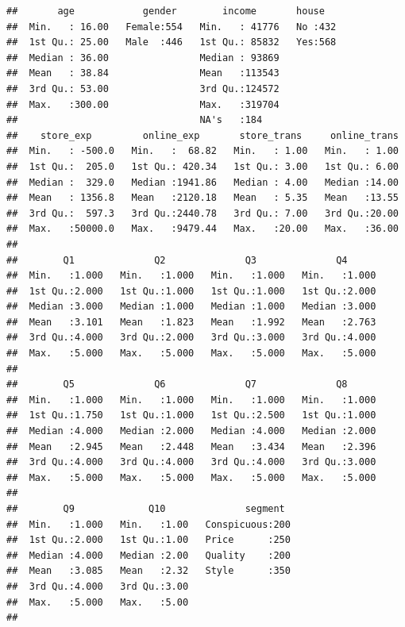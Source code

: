 \documentclass[]{book}
\theoremstyle{definition}
\theoremstyle{definition}
\theoremstyle{remark}
\begin{document}
\begin{verbatim}
##       age            gender        income       house    
##  Min.   : 16.00   Female:554   Min.   : 41776   No :432  
##  1st Qu.: 25.00   Male  :446   1st Qu.: 85832   Yes:568  
##  Median : 36.00                Median : 93869            
##  Mean   : 38.84                Mean   :113543            
##  3rd Qu.: 53.00                3rd Qu.:124572            
##  Max.   :300.00                Max.   :319704            
##                                NA's   :184               
##    store_exp         online_exp       store_trans     online_trans  
##  Min.   : -500.0   Min.   :  68.82   Min.   : 1.00   Min.   : 1.00  
##  1st Qu.:  205.0   1st Qu.: 420.34   1st Qu.: 3.00   1st Qu.: 6.00  
##  Median :  329.0   Median :1941.86   Median : 4.00   Median :14.00  
##  Mean   : 1356.8   Mean   :2120.18   Mean   : 5.35   Mean   :13.55  
##  3rd Qu.:  597.3   3rd Qu.:2440.78   3rd Qu.: 7.00   3rd Qu.:20.00  
##  Max.   :50000.0   Max.   :9479.44   Max.   :20.00   Max.   :36.00  
##                                                                     
##        Q1              Q2              Q3              Q4       
##  Min.   :1.000   Min.   :1.000   Min.   :1.000   Min.   :1.000  
##  1st Qu.:2.000   1st Qu.:1.000   1st Qu.:1.000   1st Qu.:2.000  
##  Median :3.000   Median :1.000   Median :1.000   Median :3.000  
##  Mean   :3.101   Mean   :1.823   Mean   :1.992   Mean   :2.763  
##  3rd Qu.:4.000   3rd Qu.:2.000   3rd Qu.:3.000   3rd Qu.:4.000  
##  Max.   :5.000   Max.   :5.000   Max.   :5.000   Max.   :5.000  
##                                                                 
##        Q5              Q6              Q7              Q8       
##  Min.   :1.000   Min.   :1.000   Min.   :1.000   Min.   :1.000  
##  1st Qu.:1.750   1st Qu.:1.000   1st Qu.:2.500   1st Qu.:1.000  
##  Median :4.000   Median :2.000   Median :4.000   Median :2.000  
##  Mean   :2.945   Mean   :2.448   Mean   :3.434   Mean   :2.396  
##  3rd Qu.:4.000   3rd Qu.:4.000   3rd Qu.:4.000   3rd Qu.:3.000  
##  Max.   :5.000   Max.   :5.000   Max.   :5.000   Max.   :5.000  
##                                                                 
##        Q9             Q10              segment   
##  Min.   :1.000   Min.   :1.00   Conspicuous:200  
##  1st Qu.:2.000   1st Qu.:1.00   Price      :250  
##  Median :4.000   Median :2.00   Quality    :200  
##  Mean   :3.085   Mean   :2.32   Style      :350  
##  3rd Qu.:4.000   3rd Qu.:3.00                    
##  Max.   :5.000   Max.   :5.00                    
## 
\end{verbatim}
\end{document}
